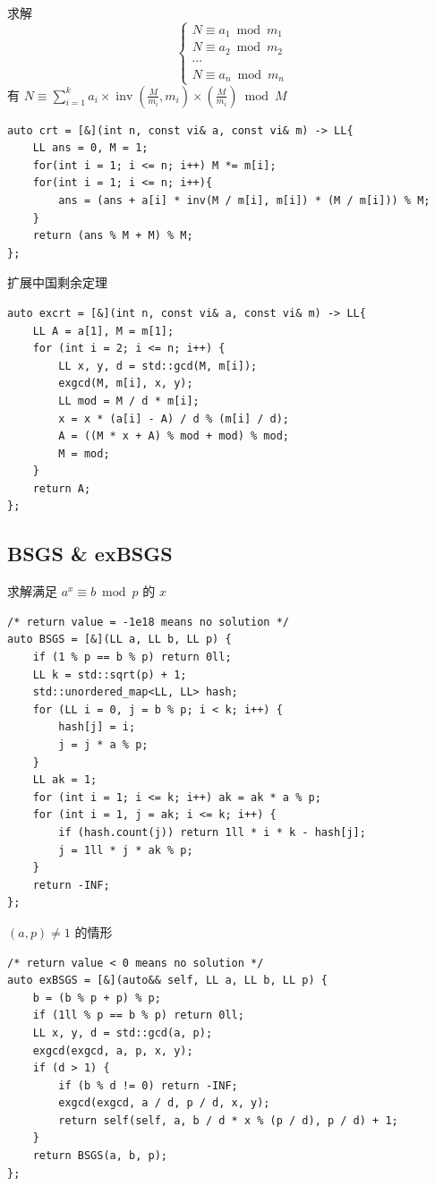 \documentclass[UTF8, a4paper, titlepage, twoside]{ctexart}
\begin{document}
求解
$$
\left\{\begin{array}{ll}N \equiv a_{1} \bmod m_{1} \\ N \equiv a_{2} \bmod m_{2} \\  \cdots \\ N \equiv a_{n} \bmod m_{n}\end{array}\right.
$$
有 $N \equiv \sum\limits_{i=1}^{k} a_{i} \times \operatorname{inv}\left(\frac{M}{m_{i}}, m_{i}\right) \times\left(\frac{M}{m_{i}}\right)\bmod M$

\begin{lstlisting}[style=cpp]
auto crt = [&](int n, const vi& a, const vi& m) -> LL{
    LL ans = 0, M = 1;
    for(int i = 1; i <= n; i++) M *= m[i];
    for(int i = 1; i <= n; i++){
        ans = (ans + a[i] * inv(M / m[i], m[i]) * (M / m[i])) % M;
    }
    return (ans % M + M) % M;
};
\end{lstlisting}

扩展中国剩余定理

\begin{lstlisting}[style=cpp]
auto excrt = [&](int n, const vi& a, const vi& m) -> LL{
    LL A = a[1], M = m[1];
    for (int i = 2; i <= n; i++) {
        LL x, y, d = std::gcd(M, m[i]);
        exgcd(M, m[i], x, y);
        LL mod = M / d * m[i];
        x = x * (a[i] - A) / d % (m[i] / d); 
        A = ((M * x + A) % mod + mod) % mod;
        M = mod;
    }
    return A;
};
\end{lstlisting}

\subsection{ BSGS \& exBSGS }

求解满足 $a ^ x \equiv b \bmod p$ 的 $x$

\begin{lstlisting}[style=cpp]
/* return value = -1e18 means no solution */
auto BSGS = [&](LL a, LL b, LL p) {
    if (1 % p == b % p) return 0ll;
    LL k = std::sqrt(p) + 1;
    std::unordered_map<LL, LL> hash;
    for (LL i = 0, j = b % p; i < k; i++) {
        hash[j] = i;
        j = j * a % p;
    }
    LL ak = 1;
    for (int i = 1; i <= k; i++) ak = ak * a % p;
    for (int i = 1, j = ak; i <= k; i++) {
        if (hash.count(j)) return 1ll * i * k - hash[j];
        j = 1ll * j * ak % p;
    }
    return -INF;
};
\end{lstlisting}

$(a, p) \neq 1$ 的情形

\begin{lstlisting}[style=cpp]
/* return value < 0 means no solution */
auto exBSGS = [&](auto&& self, LL a, LL b, LL p) {
    b = (b % p + p) % p;
    if (1ll % p == b % p) return 0ll;
    LL x, y, d = std::gcd(a, p);
    exgcd(exgcd, a, p, x, y);
    if (d > 1) {
        if (b % d != 0) return -INF;
        exgcd(exgcd, a / d, p / d, x, y);
        return self(self, a, b / d * x % (p / d), p / d) + 1;
    }
    return BSGS(a, b, p);
};
\end{lstlisting}
\end{document}
